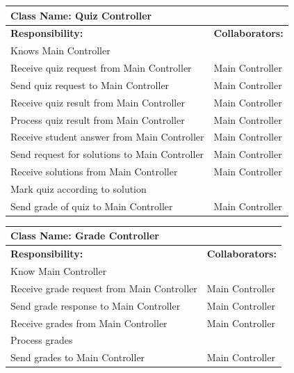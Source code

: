 \documentclass[]{article}
\begin{document}
\begin{enumerate}[a)]
	\begin{table}[H]
	\centering
		\begin{tabular}{|p{5cm}|p{5cm}|}
		\hline
		 \multicolumn{2}{|l|}{\textbf{Class Name: Quiz Controller}} \\
		\hline
		\textbf{Responsibility:} & \textbf{Collaborators:} \\
		\hline
		Knows Main Controller & \\
		\hline
		Receive quiz request from Main Controller & Main Controller \\
		\hline
		Send quiz request to Main Controller & Main Controller \\
		\hline
		Receive quiz result from Main Controller & Main Controller \\
		\hline
		Process quiz result from Main Controller & Main Controller \\
		\hline
		Receive student answer from Main Controller & Main Controller \\
		\hline
		Send request for solutions to Main Controller & Main Controller \\
		\hline
		Receive solutions from Main Controller & Main Controller \\
		\hline
		Mark quiz according to solution & \\
		\hline
		Send grade of quiz to Main Controller & Main Controller \\
		\hline

		\end{tabular}
	\end{table}


	\begin{table}[H]
	\centering
		\begin{tabular}{|p{5cm}|p{5cm}|}
		\hline
		 \multicolumn{2}{|l|}{\textbf{Class Name: Grade Controller}} \\
		\hline
		\textbf{Responsibility:} & \textbf{Collaborators:} \\
		\hline
		Know Main Controller \\
		\hline
		Receive grade request from Main Controller & Main Controller \\
		\hline
		Send grade response to Main Controller & Main Controller \\
		\hline
		Receive grades from Main Controller & Main Controller \\
		\hline
		Process grades & \\
		\hline
		Send grades to Main Controller & Main Controller \\
		\hline
		\end{tabular}
	\end{table}


\end{enumerate}
\end{document}
